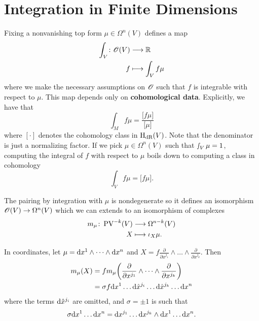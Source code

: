 \section{Integration in Finite Dimensions}

Fixing a nonvanishing top form $\mu \in \Omega^{n}(V)$ defines a map
\begin{align*}
  \int_V \colon \mathscr{O}(V)
  &\longrightarrow \mathbb{R} \\
  f
  &\longmapsto \int_V f \mu
\end{align*}
where we make the necessary assumptions on $\mathscr{O}$ such that $f$ is integrable with respect to $\mu$.
This map depends only on \textbf{cohomological data}. Explicitly, we have that
\begin{equation*}
  \int_M f \mu = \frac{\bigl[f \mu\bigr]}{\bigl[\mu\bigr]}
\end{equation*}
where $[\cdot]$ denotes the cohomology class in $\mathrm{H}_{\text{dR}} (V)$.
Note that the denominator is just a normalizing factor.
If we pick $\mu \in \Omega^n(V)$ such that $\smallint_V \mu = 1$, computing the integral of $f$ with respect to $\mu$ boils down to computing a class in cohomology
\begin{equation*}
  \int_V f \mu = \bigl[f \mu\bigr].
\end{equation*}

The pairing by integration with $\mu$ is nondegenerate so it defines an isomorphism $\mathscr{O}(V) \to \Omega^n(V)$ which we can extends to an isomorphism of complexes
\begin{align*}
  m_\mu \colon \operatorname{PV}^{-k} (V) 
  &\longrightarrow \Omega^{n - k} (V) \\
  X
  &\longmapsto \iota_X \mu.
\end{align*}

\begin{example}
  In coordinates, let $\mu = \mathrm{d} x^1 \wedge \dots \wedge \mathrm{d} x^n$ and $X = f \frac{\partial}{\partial x^{j_1}} \wedge \dots \wedge \frac{\partial}{\partial x^{j_k}}$. Then
  \begin{align*}
    m_{\mu} (X)
    &= f m_{\mu} \biggl( \frac{\partial}{\partial x^{j_1}} \wedge \dots \wedge \frac{\partial}{\partial x^{j_k}} \biggr) \\
    &= \sigma f \mathrm{d} x^1 \dots \mathrm{d} \hat{x}^{j_i} \dots \mathrm{d} \hat{x}^{j_k} \dots \mathrm{d} x^n
  \end{align*}
  where the terms $\mathrm{d} \hat{x}^{j_i}$ are omitted, and $\sigma = \pm 1$ is such that
  \begin{equation*}
    \sigma \mathrm{d} x^1 \dots \mathrm{d} x^n
    = \mathrm{d} x^{j_1} \dots \mathrm{d} x^{j_k} \wedge \mathrm{d} x^1 \dots \mathrm{d} x^n.
  \end{equation*}
\end{example}

